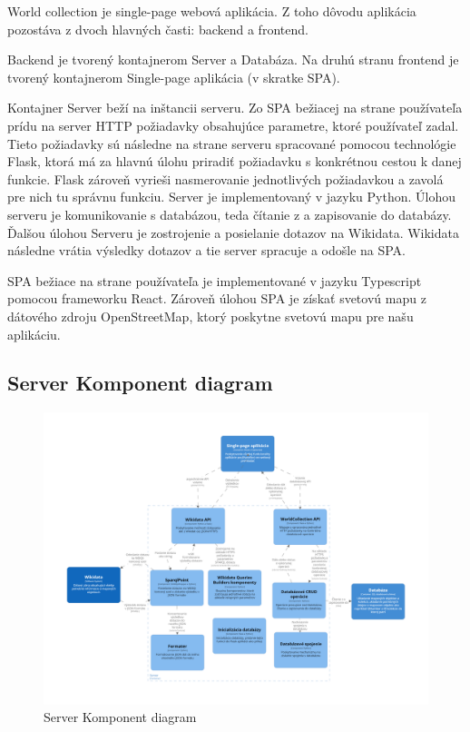 World collection je single-page webová aplikácia. Z toho dôvodu aplikácia pozostáva z dvoch hlavných časti: backend a frontend.

Backend je tvorený kontajnerom Server a Databáza. Na druhú stranu frontend je tvorený kontajnerom Single-page aplikácia (v skratke SPA).

Kontajner Server beží na inštancii serveru. Zo SPA bežiacej na strane používateľa prídu na server HTTP požiadavky obsahujúce parametre, ktoré používateľ zadal.
Tieto požiadavky sú následne na strane serveru spracované pomocou technológie Flask, ktorá má za hlavnú úlohu priradiť požiadavku s konkrétnou cestou k
danej funkcie. Flask zároveň vyrieši nasmerovanie jednotlivých požiadavkou a zavolá pre nich tu správnu funkciu.
Server je implementovaný v jazyku Python. Úlohou serveru je komunikovanie s databázou, teda čítanie z a zapisovanie do databázy.
Ďalšou úlohou Serveru je zostrojenie a posielanie dotazov
na Wikidata. Wikidata následne vrátia výsledky dotazov a tie server spracuje a odošle na SPA.

SPA bežiace na strane používateľa je implementované v jazyku Typescript pomocou frameworku
React. Zároveň úlohou SPA je získať svetovú mapu z dátového zdroju OpenStreetMap, ktorý poskytne svetovú mapu
pre našu aplikáciu.

\subsection{Server Komponent diagram }

\begin{figure}[h]
      \includegraphics[width=140mm]{../img/structurizr-ServerComponents}
      \caption{Server Komponent diagram }
\end{figure}

